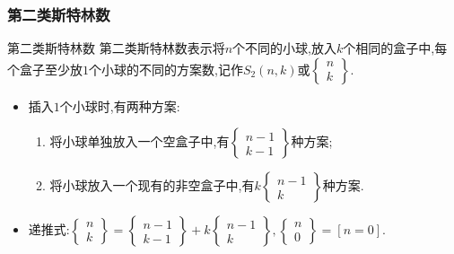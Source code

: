 \documentclass{beamer}
\newcommand{\pau}{}
\begin{document}
\begin{frame}[fragile]
    \frametitle{第二类斯特林数}
    \begin{block}{第二类斯特林数}
        第二类斯特林数表示将$n$个不同的小球,放入$k$个相同的盒子中,每个盒子至少放$1$个小球的不同的方案数,记作$S_2(n,k)$或$\begin{Bmatrix}n\\k\end{Bmatrix}$.
    \end{block}\pau
    \begin{itemize}
        \item 插入$1$个小球时,有两种方案:\pau
        \begin{enumerate}
        	\item 将小球单独放入一个空盒子中,有$\begin{Bmatrix}n-1\\k-1\end{Bmatrix}$种方案;\pau
        	\item 将小球放入一个现有的非空盒子中,有$k\begin{Bmatrix}n-1\\k\end{Bmatrix}$种方案.\pau
        \end{enumerate}
        \item 递推式:$\begin{Bmatrix}n\\k\end{Bmatrix}=\begin{Bmatrix}n-1\\k-1\end{Bmatrix}+k\begin{Bmatrix}n-1\\k\end{Bmatrix},\begin{Bmatrix}n\\0\end{Bmatrix}=[n=0]$.
    \end{itemize}
\end{frame}
\end{document}
